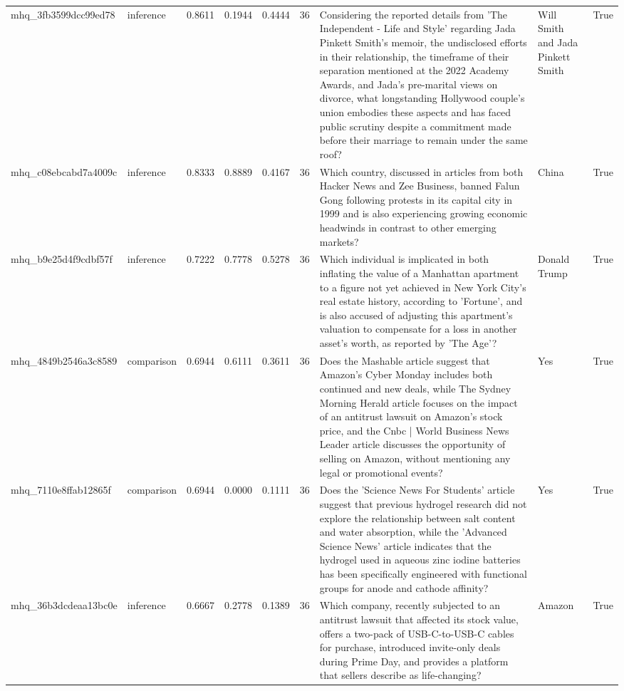 \begin{tabular}{llrrrrllr}
mhq_3fb3599dcc99ed78 & inference & 0.8611 & 0.1944 & 0.4444 & 36 & Considering the reported details from 'The Independent - Life and Style' regarding Jada Pinkett Smith's memoir, the undisclosed efforts in their relationship, the timeframe of their separation mentioned at the 2022 Academy Awards, and Jada's pre-marital views on divorce, what longstanding Hollywood couple's union embodies these aspects and has faced public scrutiny despite a commitment made before their marriage to remain under the same roof? & Will Smith and Jada Pinkett Smith & True \\
mhq_c08ebcabd7a4009c & inference & 0.8333 & 0.8889 & 0.4167 & 36 & Which country, discussed in articles from both Hacker News and Zee Business, banned Falun Gong following protests in its capital city in 1999 and is also experiencing growing economic headwinds in contrast to other emerging markets? & China & True \\
mhq_b9e25d4f9cdbf57f & inference & 0.7222 & 0.7778 & 0.5278 & 36 & Which individual is implicated in both inflating the value of a Manhattan apartment to a figure not yet achieved in New York City's real estate history, according to 'Fortune', and is also accused of adjusting this apartment's valuation to compensate for a loss in another asset's worth, as reported by 'The Age'? & Donald Trump & True \\
mhq_4849b2546a3c8589 & comparison & 0.6944 & 0.6111 & 0.3611 & 36 & Does the Mashable article suggest that Amazon's Cyber Monday includes both continued and new deals, while The Sydney Morning Herald article focuses on the impact of an antitrust lawsuit on Amazon's stock price, and the Cnbc | World Business News Leader article discusses the opportunity of selling on Amazon, without mentioning any legal or promotional events? & Yes & True \\
mhq_7110e8ffab12865f & comparison & 0.6944 & 0.0000 & 0.1111 & 36 & Does the 'Science News For Students' article suggest that previous hydrogel research did not explore the relationship between salt content and water absorption, while the 'Advanced Science News' article indicates that the hydrogel used in aqueous zinc iodine batteries has been specifically engineered with functional groups for anode and cathode affinity? & Yes & True \\
mhq_36b3dcdeaa13bc0e & inference & 0.6667 & 0.2778 & 0.1389 & 36 & Which company, recently subjected to an antitrust lawsuit that affected its stock value, offers a two-pack of USB-C-to-USB-C cables for purchase, introduced invite-only deals during Prime Day, and provides a platform that sellers describe as life-changing? & Amazon & True \\

\end{tabular}
